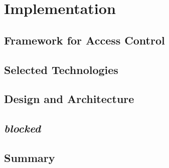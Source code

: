 \chapter{Implementation}

\section{Framework for Access Control}

\section{Selected Technologies}


\section{Design and Architecture}

\section{\textit{blocked}}

\section{Summary}


